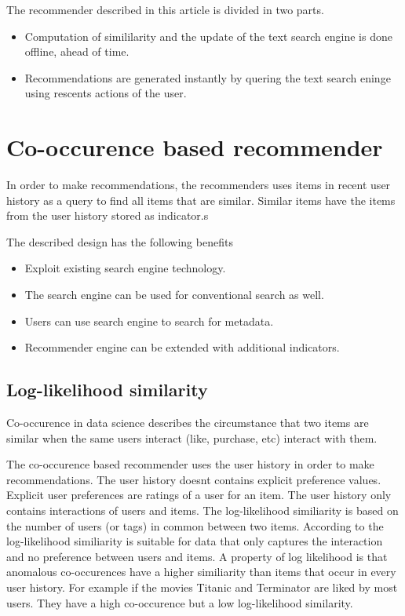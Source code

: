 \documentclass[twoside,a4paper]{article}
\begin{document}
The recommender described in this article is divided in two parts.
\begin{itemize}
\item Computation of simililarity and the update of the text search engine is done offline, ahead of time.
\item Recommendations are generated instantly by quering the text search eninge using rescents actions of the user.

\end{itemize}

\section{Co-occurence based recommender}
\label{sec:cooccurence}

In order to make recommendations, the recommenders uses items in recent user history as a query to find all items that are similar. Similar items have the items from the user history stored as indicator.s

The described design has the following benefits
\begin{itemize}
\item Exploit existing search engine technology.
\item The search engine can be used for conventional search as well.
\item Users can use search engine to search for metadata.
\item Recommender engine can be extended with additional indicators.
\end{itemize}

\subsection{Log-likelihood similarity}
\label{sec:llr}

Co-occurence in data science describes the circumstance that two items are similar when the same users interact (like, purchase, etc) interact with them.

The co-occurence based recommender uses the user history in order to make recommendations. The user history doesnt contains explicit preference values. Explicit user preferences are ratings of a user for an item. The user history only contains interactions of users and items. The log-likelihood similiarity is based on the number of users (or tags) in common between two items. According to \cite{Dunning93} the log-likelihood similiarity is suitable for data that only captures the interaction and no preference between users and items. A property of log likelihood is that anomalous co-occurences have a higher similiarity than items that occur in every user history. For example if the movies Titanic and Terminator are liked by most users. They have a high co-occurence but a low log-likelihood similarity.
\end{document}
